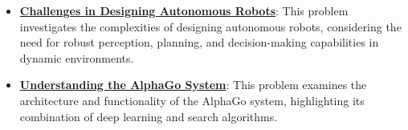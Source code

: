 \documentclass{article}%
\begin{document}
\begin{itemize}[leftmargin=*]
\item \href{\url{https://purdue.brightspace.com/d2l/common/assets/pdfjs-d2l-dist/1.0.14-legacy/web/viewer.html?file=\%252Fcontent\%252Fenforced\%252F1095467-wl.202510.CS.24300.001\%252F02L2-Intro.pdf\%253Fou\%253D1095467\&lang=en-us\&container=d2l-fileviewer-rendered-pdf\&fullscreen=d2l-fileviewer-rendered-pdf-dialog\&height=667}#page=25}{\textbf{Challenges in Designing Autonomous Robots}}: This problem investigates the complexities of designing autonomous robots, considering the need for robust perception, planning, and decision-making capabilities in dynamic environments.%
\item \href{\url{https://purdue.brightspace.com/d2l/common/assets/pdfjs-d2l-dist/1.0.14-legacy/web/viewer.html?file=\%252Fcontent\%252Fenforced\%252F1095467-wl.202510.CS.24300.001\%252F02L2-Intro.pdf\%253Fou\%253D1095467\&lang=en-us\&container=d2l-fileviewer-rendered-pdf\&fullscreen=d2l-fileviewer-rendered-pdf-dialog\&height=667}#page=50}{\textbf{Understanding the AlphaGo System}}: This problem examines the architecture and functionality of the AlphaGo system, highlighting its combination of deep learning and search algorithms.%
\end{itemize}%
\end{document}
